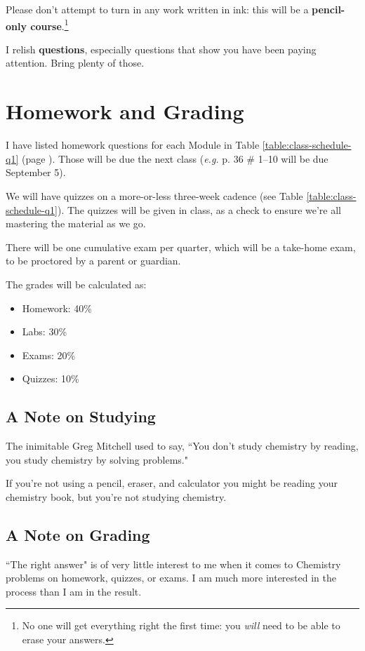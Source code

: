 \documentclass[11pt, oneside]{article}   	%
\begin{document}
Please don't attempt to turn in any work written in ink: this will be a \textbf{pencil-only course}.\footnote{No one will get everything right the first time: you \emph{will} need to be able to erase your answers.}

I relish \textbf{questions}, especially questions that show you have been paying attention. Bring plenty of those.


\section{Homework and Grading}
I have listed homework questions for each Module in Table \ref{table:class-schedule-q1} (page \pageref{table:class-schedule-q1}).
Those will be due the next class (\emph{e.g.} p. 36 \# 1--10 will be due September 5).

We will have quizzes on a more-or-less three-week cadence (see Table \ref{table:class-schedule-q1}).
The quizzes will be given in class, as a check to ensure we're all mastering the material as we go.

There will be one cumulative exam per quarter, which will be a take-home exam, to be proctored by a parent or guardian.

The grades will be calculated as:
\begin{itemize}
\item Homework: 40\%
\item Labs: 30\%
\item Exams: 20\%
\item Quizzes: 10\%
\end{itemize}

\subsection{A Note on Studying}
The inimitable Greg Mitchell used to say, ``You don't study chemistry by reading, you study chemistry by solving problems."

If you're not using a pencil, eraser, and calculator you might be reading your chemistry book, but you're not studying chemistry.

\subsection{A Note on Grading}
 ``The right answer" is of very little interest to me when it comes to Chemistry problems on homework, quizzes, or exams. 
I am much more interested in the process than I am in the result. 
\end{document}
